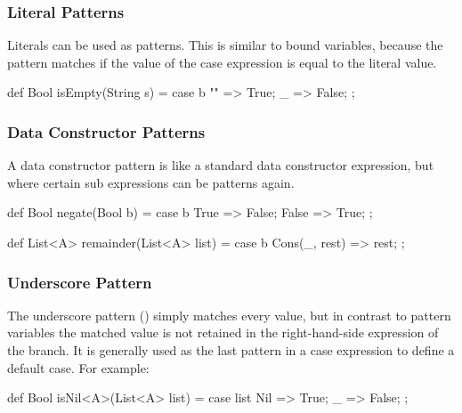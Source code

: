 \subsubsection{Literal Patterns}
Literals can be used as patterns. This is similar to bound variables, because the pattern matches if the value of the case expression is equal to the literal value.

\begin{abscode}
def Bool isEmpty(String s) =
  case b {
    "" => True;
    _  => False;
  };
\end{abscode}

\subsubsection{Data Constructor Patterns}
A data constructor pattern is like a standard data constructor expression, but where certain sub expressions can be patterns again.

\begin{abscode}
def Bool negate(Bool b) =
  case b {
    True => False;
    False => True;
  };
\end{abscode}

\begin{abscode}
def List<A> remainder(List<A> list) =
  case b {
    Cons(_, rest) => rest;
  };
\end{abscode}

\subsubsection{Underscore Pattern}
The underscore pattern (\absinline{_}) simply matches every value, but
in contrast to pattern variables the matched value is not retained in
the right-hand-side expression of the branch.  It is generally used as
the last pattern in a case expression to define a default case.  For
example:
\begin{abscode}
def Bool isNil<A>(List<A> list) =
  case list {
    Nil => True;
    _ => False;
  };
\end{abscode}




